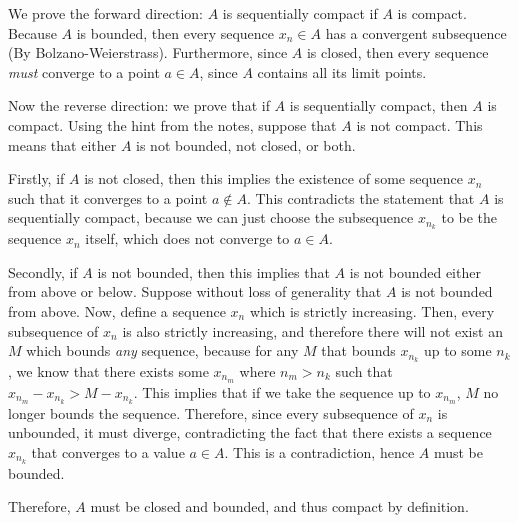 \documentclass[10pt]{article}
\begin{document}
	\begin{solution}
		We prove the forward direction: $A$ is sequentially compact if $A$ is compact. Because $A$ is bounded,
		then every sequence $x_n \in A$ has a convergent subsequence (By Bolzano-Weierstrass). Furthermore,
		since $A$ is closed, then every sequence \textit{must} converge to a point $a \in A$, since $A$ contains
		all its limit points.

		Now the reverse direction: we prove that if $A$ is sequentially compact, then $A$ is compact. Using the
		hint from the notes, suppose that $A$ is not compact. This means that either $A$ is not bounded, not 
		closed, or both.

		Firstly, if $A$ is not closed, then this implies the existence of some sequence $x_n$ such that it 
		converges to a point $a \not\in A$. This contradicts the statement that $A$ is sequentially compact, 
		because we can just choose the subsequence $x_{n_k}$ to be the sequence $x_n$ itself, which does not
		converge to $a \in A$. 

		Secondly, if $A$ is not bounded, then this implies that $A$ is not bounded either from above or below. 
		Suppose without loss of generality that $A$ is not bounded from above. Now, define a sequence $x_n$ which
		is strictly increasing. Then, every subsequence of $x_n$ is also strictly increasing, and therefore there
		will not exist an $M$ which bounds \textit{any} sequence, because for any $M$ that bounds  
		$x_{n_k}$ up to some $n_k$, we know that there exists some $x_{n_m}$ where $n_m > n_k$ such that $x_{n_m}
		- x_{n_k} > M - x_{n_k}$. This implies that if we take the sequence up to $x_{n_m}$, $M$ no longer bounds
		the sequence. Therefore, since every subsequence of $x_n$ is unbounded, it must diverge, contradicting 
		the fact that there exists a sequence $x_{n_k}$ that converges to a value $a \in A$. This is a 
		contradiction, hence $A$ must be bounded. 

		Therefore, $A$ must be closed and bounded, and thus compact by definition. 
	\end{solution}
\end{document}
